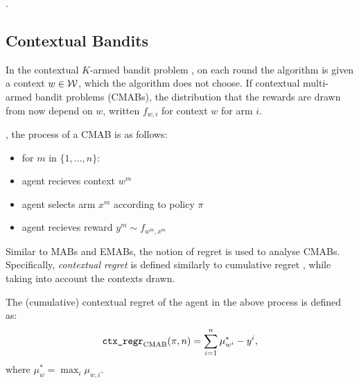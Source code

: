 
        .



    
    \subsection{Contextual Bandits}
    \label{sec:2-3-2-contextual-mab}


        In the contextual $K$-armed bandit problem , on each round the algorithm is given a context $w\in \mathcal{W}$, which the algorithm does not choose. If contextual multi-armed bandit problems (CMABs), the distribution that the rewards are drawn from now depend on $w$, written $f_{w,i}$ for context $w$ for arm $i$. 


        , the process of a CMAB is as follows:
        \begin{itemize}
            \item for $m$ in $\{1,...,n\}$:
            \item agent recieves context $w^m$
            \item agent selects arm $x^m$ according to policy $\pi$
            \item agent recieves reward $y^m \sim f_{w^m,x^m}$
        \end{itemize}

        Similar to MABs and EMABs, the notion of regret is used to analyse CMABs. Specifically, \textit{contextual regret} is defined similarly to cumulative regret , while taking into account the contexts drawn.

        \begin{defn}
            The \textnormal{(cumulative) contextual regret} of the agent in the above process is defined as:
            \begin{align}
                {\textnormal{\texttt{ctx\_regr}}}_{{\textnormal{CMAB}}}(\pi,n) = \sum_{i=1}^n \mu_{w^i}^* - y^i,
            \end{align}
            where $\mu_{w}^* = \max_i \mu_{w,i}$.
        \end{defn}

